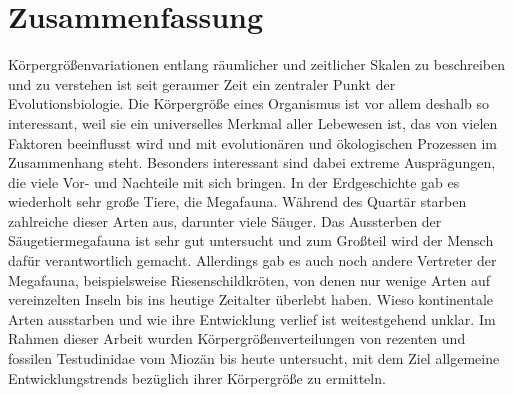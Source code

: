 \section{Zusammenfassung}

Körpergrößenvariationen entlang räumlicher und zeitlicher Skalen zu beschreiben und zu verstehen ist seit geraumer Zeit ein zentraler Punkt der Evolutionsbiologie.
Die Körpergröße eines Organismus ist vor allem deshalb so interessant, weil sie ein universelles Merkmal aller Lebewesen ist, das von vielen Faktoren beeinflusst wird und mit evolutionären und ökologischen Prozessen im Zusammenhang steht. 
Besonders interessant sind dabei extreme Ausprägungen, die 
viele Vor- und Nachteile mit sich bringen.
In der Erdgeschichte gab es wiederholt sehr große Tiere, die Megafauna.
Während des Quartär starben zahlreiche dieser Arten aus, darunter viele Säuger. Das Aussterben der Säugetiermegafauna ist sehr gut untersucht und zum Großteil wird der Mensch dafür verantwortlich gemacht. 
Allerdings gab es auch noch andere Vertreter der Megafauna, beispielsweise Riesenschildkröten, von denen nur wenige Arten auf vereinzelten Inseln bis ins heutige Zeitalter überlebt haben. Wieso kontinentale Arten ausstarben und wie ihre Entwicklung verlief ist weitestgehend unklar.
Im Rahmen dieser Arbeit wurden Körpergrößenverteilungen von rezenten und fossilen Testudinidae vom Miozän bis heute untersucht, mit dem Ziel allgemeine Entwicklungstrends bezüglich ihrer Körpergröße zu ermitteln.
